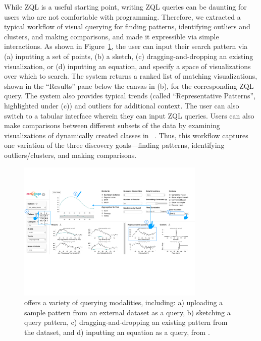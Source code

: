 \par While ZQL is a useful starting point, writing ZQL
queries can be daunting for users who are not comfortable
with programming.
Therefore, we extracted a typical workflow
of visual querying for finding patterns, identifying
outliers and clusters, and making comparisons, and made it expressible
via simple interactions. As shown in Figure~\ref{fig:modalities}, the user can input their search pattern via (a) inputting a set of points,
(b) a sketch, (c) dragging-and-dropping an existing visualization,
or (d) inputting an equation, 
and specify a space of visualizations over which to search.
The system returns a ranked list of matching visualizations, shown in the ``Results'' pane below the canvas in (b), for the corresponding ZQL query.
The system also provides typical trends 
(called ``Representative Patterns'', highlighted under (c)) and outliers
for additional context. 
The user can also switch to a tabular interface wherein
they can input ZQL queries.  
Users can also make comparisons between different 
subsets of the data by examining visualizations 
of dynamically created classes in \zv~\cite{Lee2017}.
Thus, this workflow captures one variation of the three
discovery goals---finding patterns, identifying outliers/clusters,
and making comparisons. 
\begin{figure}[ht!]%
\centering
\vspace{-10pt}
\includegraphics[width=0.8\textwidth]{figures/modalities.pdf}
\caption{\zv offers a variety of querying modalities, including: a) uploading a sample pattern from an external dataset as a query, b) sketching a query pattern, c) dragging-and-dropping an existing pattern from the dataset, and d) inputting an equation as a query, from \cite{Lee2017}.}
\label{fig:modalities}
\vspace{-10pt}
\end{figure}


